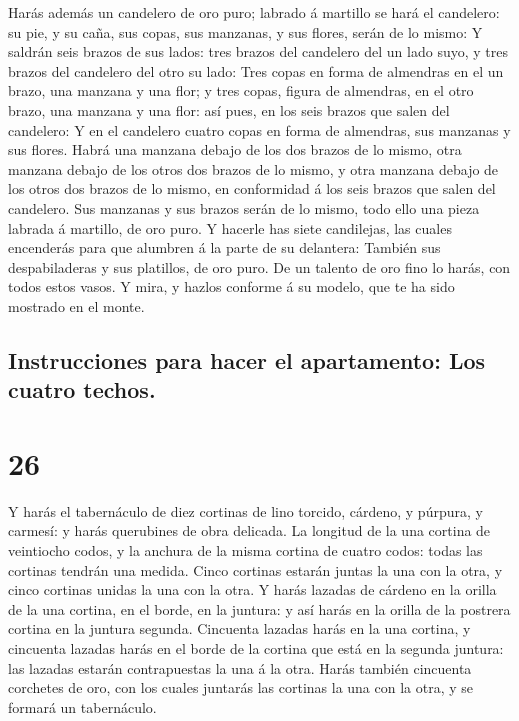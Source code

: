  Harás además un candelero de oro puro; labrado á martillo
se hará el candelero: su pie, y su caña, sus copas, sus manzanas, y sus
flores, serán de lo mismo:  Y saldrán seis brazos de sus
lados: tres brazos del candelero del un lado suyo, y tres brazos del
candelero del otro su lado:  Tres copas en forma de
almendras en el un brazo, una manzana y una flor; y tres copas, figura
de almendras, en el otro brazo, una manzana y una flor: así pues, en los
seis brazos que salen del candelero:  Y en el candelero
cuatro copas en forma de almendras, sus manzanas y sus flores.
 Habrá una manzana debajo de los dos brazos de lo mismo,
otra manzana debajo de los otros dos brazos de lo mismo, y otra manzana
debajo de los otros dos brazos de lo mismo, en conformidad á los seis
brazos que salen del candelero.  Sus manzanas y sus brazos
serán de lo mismo, todo ello una pieza labrada á martillo, de oro puro.
 Y hacerle has siete candilejas, las cuales encenderás para
que alumbren á la parte de su delantera:  También sus
despabiladeras y sus platillos, de oro puro.  De un talento
de oro fino lo harás, con todos estos vasos.  Y mira, y
hazlos conforme á su modelo, que te ha sido mostrado en el monte.

\hypertarget{instrucciones-para-hacer-el-apartamento-los-cuatro-techos.}{%
\subsection{Instrucciones para hacer el apartamento: Los cuatro
techos.}\label{instrucciones-para-hacer-el-apartamento-los-cuatro-techos.}}

\hypertarget{section-25}{%
\section{26}\label{section-25}}

 Y harás el tabernáculo de diez cortinas de lino torcido,
cárdeno, y púrpura, y carmesí: y harás querubines de obra delicada.
 La longitud de la una cortina de veintiocho codos, y la
anchura de la misma cortina de cuatro codos: todas las cortinas tendrán
una medida.  Cinco cortinas estarán juntas la una con la
otra, y cinco cortinas unidas la una con la otra.  Y harás
lazadas de cárdeno en la orilla de la una cortina, en el borde, en la
juntura: y así harás en la orilla de la postrera cortina en la juntura
segunda.  Cincuenta lazadas harás en la una cortina, y
cincuenta lazadas harás en el borde de la cortina que está en la segunda
juntura: las lazadas estarán contrapuestas la una á la otra.
 Harás también cincuenta corchetes de oro, con los cuales
juntarás las cortinas la una con la otra, y se formará un tabernáculo.

